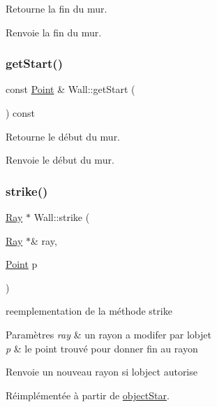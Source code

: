 Retourne la fin du mur. \begin{DoxyReturn}{Renvoie}
la fin du mur. 
\end{DoxyReturn}
\mbox{\label{class_wall_a174f962e72ade4212b51f7434cf2b514}} 
\subsubsection{\texorpdfstring{getStart()}{getStart()}}
{\footnotesize\ttfamily const \mbox{\hyperlink{class_point}{Point}} \& Wall\+::get\+Start (\begin{DoxyParamCaption}{ }\end{DoxyParamCaption}) const}

Retourne le début du mur. \begin{DoxyReturn}{Renvoie}
le début du mur. 
\end{DoxyReturn}
\mbox{\label{class_wall_a9ff7569800f55d50d4059ddfd780afe9}} 
\subsubsection{\texorpdfstring{strike()}{strike()}}
{\footnotesize\ttfamily \mbox{\hyperlink{class_ray}{Ray}} $\ast$ Wall\+::strike (\begin{DoxyParamCaption}\item[{\mbox{\hyperlink{class_ray}{Ray}} $\ast$\&}]{ray,  }\item[{\mbox{\hyperlink{class_point}{Point}}}]{p }\end{DoxyParamCaption})\hspace{0.3cm}{\ttfamily [virtual]}}

reemplementation de la méthode strike 
\begin{DoxyParams}{Paramètres}
{\em ray} & un rayon a modifer par l\textquotesingle{}objet \\
\hline
{\em p} & le point trouvé pour donner fin au rayon \\
\hline
\end{DoxyParams}
\begin{DoxyReturn}{Renvoie}
un nouveau rayon si l\textquotesingle{}object autorise 
\end{DoxyReturn}


Réimplémentée à partir de \mbox{\hyperlink{classobject_star_a5155713af07f8397057706a1eeb843ed}{object\+Star}}.



